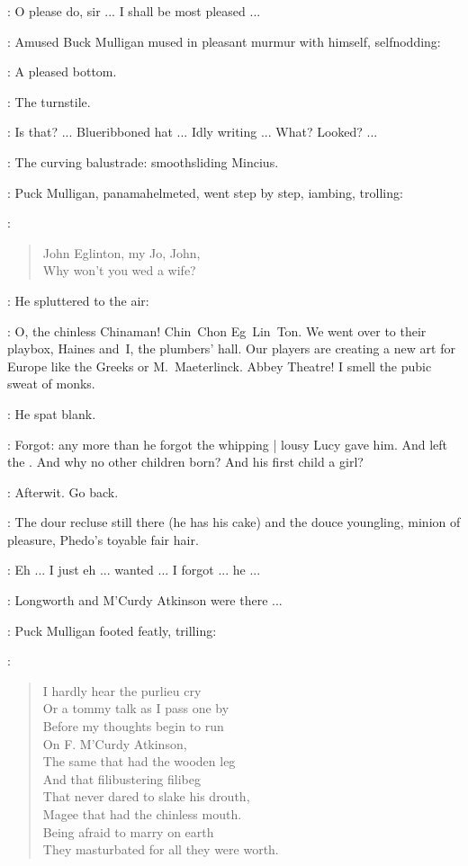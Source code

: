 \librarian:
O please do, sir ...
I shall be most pleased ...

:
Amused Buck Mulligan mused in pleasant murmur with himself,
self\-nodding:

\mulligan:
A pleased bottom.

\StephenInt:
The turnstile.

\StephenInt:
Is that? ...
Blueribboned hat ...
Idly writing ...
What?
Looked? ...

\StephenInt:
The curving balustrade:
smoothsliding Mincius.

:
Puck Mulligan,
panamahelmeted,
went step by step,
iambing,
trolling:

\mulligan:
\begin{verse}
    John Eglinton, my Jo, John, \\
    Why won't you wed a wife?
\end{verse}

:
He spluttered to the air:

\mulligan:
O, the chinless Chinaman!
Chin~Chon Eg~Lin~Ton.
We went over to their playbox,
Haines and~I,
the plumbers' hall.
Our players are creating a new art for Europe
like the Greeks or M.~Maeterlinck.
Abbey Theatre!
I smell the pubic sweat of monks.

:
He spat blank.

\StephenInt:
Forgot:
any more than he forgot the whipping |
lousy Lucy gave him.
And left the .
And why no other children born?
And his first child a girl?

\StephenInt:
Afterwit.
Go back.

\StephenInt:
The dour recluse still there (he has his cake)
and the douce youngling,
minion of pleasure,
Phedo's toyable fair hair.

\StephenInt:
Eh ...
I just eh ...
wanted ...
I forgot ...
he ...

\mulligan:
Longworth and M'Curdy Atkinson were there ...

:
Puck Mulligan footed featly,
trilling:

\mulligan:
\begin{verse}
    I hardly hear the purlieu cry \\
    Or a tommy talk as I pass one by \\
    Before my thoughts begin to run \\
    On F. M'Curdy Atkinson, \\
    The same that had the wooden leg \\
    And that filibustering filibeg \\
    That never dared to slake his drouth, \\
    Magee that had the chinless mouth.
 \\
    Being afraid to marry on earth \\
    They masturbated for all they were worth.
\end{verse}

